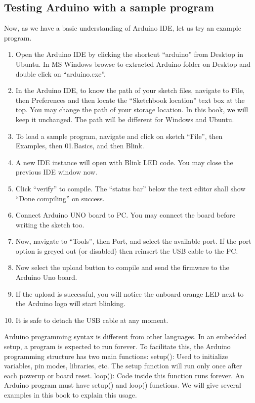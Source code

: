 \subsection{Testing Arduino with a sample program}
\label{sec:testing-arduino}
Now, as we have a basic understanding of Arduino IDE, let us try an
example program.
\begin{enumerate}
      \item Open the Arduino IDE by clicking the shortcut ``arduino'' from
            Desktop in Ubuntu. In MS Windows browse to extracted Arduino folder
            on Desktop and double click on ``arduino.exe''.
      \item In the Arduino IDE, to know the path of your sketch files,
            navigate to File, then Preferences and then locate the ``Sketchbook
            location'' text box at the top.  You may change the path of your
            storage location. In this book, we will keep it unchanged. The path
            will be different for Windows and Ubuntu.
      \item To load a sample program, navigate and click on sketch ``File'',
            then Examples, then 01.Basics, and then Blink.
      \item A new IDE instance will open with Blink LED code.  You may close
            the previous IDE window now.
      \item Click ``verify'' to compile. The ``status bar'' below the text editor
            shall show ``Done compiling'' on success.
      \item Connect Arduino UNO board to PC. You may connect the board
            before writing the sketch too.
      \item Now, navigate to ``Tools'', then Port, and select the available
            port. If the port option is greyed out (or disabled) then reinsert the
            USB cable to the PC.
      \item Now select the upload button to compile and send the firmware to
            the Arduino Uno board.
      \item If the upload is successful, you will notice the onboard orange LED
            next to the Arduino logo will start blinking.
      \item It is safe to detach the USB cable at any moment.
\end{enumerate}

Arduino programming syntax is different from other languages. In an
embedded setup, a program is expected to run forever. To facilitate
this, the Arduino programming structure has two main functions: setup():
Used to initialize variables, pin modes, libraries, etc. The setup
function will run only once after each powerup or board reset.
loop(): Code inside this function runs forever. An Arduino program
must have setup() and loop() functions.  We will give several examples
in this book to explain this usage.

